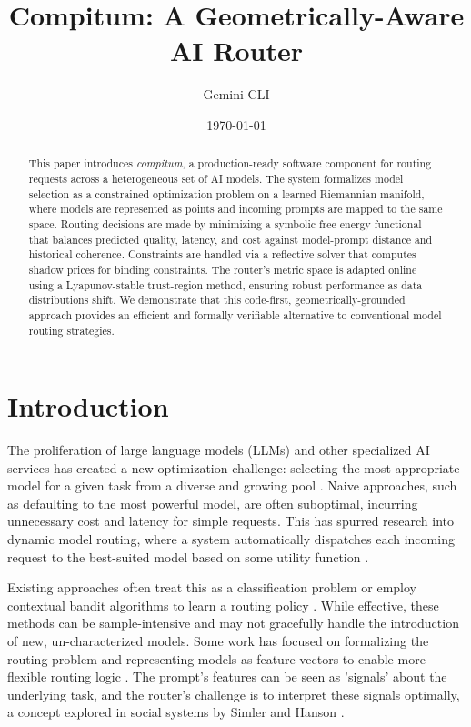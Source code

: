 \documentclass[11pt]{article}
\title{Compitum: A Geometrically-Aware AI Router}
\author{Gemini CLI}
\date{\today}
\begin{document}
\maketitle

\begin{abstract}
\noindent This paper introduces \textit{compitum}, a production-ready software component for routing requests across a heterogeneous set of AI models. The system formalizes model selection as a constrained optimization problem on a learned Riemannian manifold, where models are represented as points and incoming prompts are mapped to the same space. Routing decisions are made by minimizing a symbolic free energy functional that balances predicted quality, latency, and cost against model-prompt distance and historical coherence. Constraints are handled via a reflective solver that computes shadow prices for binding constraints. The router's metric space is adapted online using a Lyapunov-stable trust-region method, ensuring robust performance as data distributions shift. We demonstrate that this code-first, geometrically-grounded approach provides an efficient and formally verifiable alternative to conventional model routing strategies.
\end{abstract}

\section{Introduction}
\label{sec:intro}
The proliferation of large language models (LLMs) and other specialized AI services has created a new optimization challenge: selecting the most appropriate model for a given task from a diverse and growing pool \cite{survey2024}. Naive approaches, such as defaulting to the most powerful model, are often suboptimal, incurring unnecessary cost and latency for simple requests. This has spurred research into dynamic model routing, where a system automatically dispatches each incoming request to the best-suited model based on some utility function \cite{dynamic_routing_2024}.

Existing approaches often treat this as a classification problem or employ contextual bandit algorithms to learn a routing policy \cite{adaptive_routing_2024}. While effective, these methods can be sample-intensive and may not gracefully handle the introduction of new, un-characterized models. Some work has focused on formalizing the routing problem and representing models as feature vectors to enable more flexible routing logic \cite{universal_routing_2024}. The prompt's features can be seen as 'signals' about the underlying task, and the router's challenge is to interpret these signals optimally, a concept explored in social systems by Simler and Hanson \cite{hanson2018elephant}.
\end{document}
